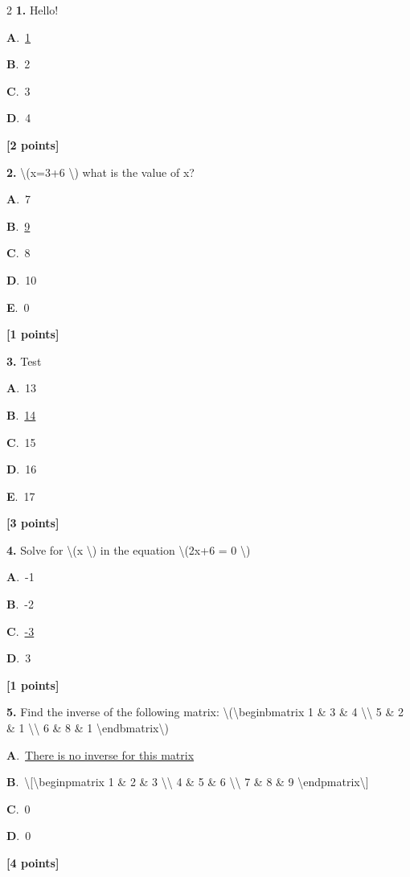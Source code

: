 \documentclass[12pt]{article}
\newcommand{\choice}[3]{%
  \noindent\textbf{#1}.~#2\hfill#3\par\vspace{0.25em}
}
\begin{document}
\begin{multicols}{2}
\noindent \textbf{\textenglish{1.}} {\textenglish{Hello!}}

\noindent\choice{A}{\underline{{\textenglish{1}}}}{}
\noindent\choice{B}{{\textenglish{2}}}{}
\noindent\choice{C}{{\textenglish{3}}}{}
\noindent\choice{D}{{\textenglish{4}}}{}
\hfill \textbf{[2 points]}\vspace{0.5em}

\noindent \textbf{\textenglish{2.}} {\textenglish{\textbackslash{}(x=3+6 \textbackslash{}) what is the value of x?}}

\noindent\choice{A}{{\textenglish{7}}}{}
\noindent\choice{B}{\underline{{\textenglish{9}}}}{}
\noindent\choice{C}{{\textenglish{8}}}{}
\noindent\choice{D}{{\textenglish{10}}}{}
\noindent\choice{E}{{\textenglish{0}}}{}
\hfill \textbf{[1 points]}\vspace{0.5em}

\noindent \textbf{\textenglish{3.}} {\textenglish{Test}}

\noindent\choice{A}{{\textenglish{13}}}{}
\noindent\choice{B}{\underline{{\textenglish{14}}}}{}
\noindent\choice{C}{{\textenglish{15}}}{}
\noindent\choice{D}{{\textenglish{16}}}{}
\noindent\choice{E}{{\textenglish{17}}}{}
\hfill \textbf{[3 points]}\vspace{0.5em}

\noindent \textbf{\textenglish{4.}} {\textenglish{Solve for \textbackslash{}(x \textbackslash{}) in the equation \textbackslash{}(2x+6 = 0 \textbackslash{})}}

\noindent\choice{A}{{\textenglish{-1}}}{}
\noindent\choice{B}{{\textenglish{-2}}}{}
\noindent\choice{C}{\underline{{\textenglish{-3}}}}{}
\noindent\choice{D}{{\textenglish{3}}}{}
\hfill \textbf{[1 points]}\vspace{0.5em}

\noindent \textbf{\textenglish{5.}} {\textenglish{Find the inverse of the following matrix: \textbackslash{}(\textbackslash{}begin{bmatrix} 1 \& 3 \& 4 \textbackslash{}\textbackslash{} 5 \& 2 \& 1 \textbackslash{}\textbackslash{} 6 \& 8 \& 1 \textbackslash{}end{bmatrix}\textbackslash{})}}

\noindent\choice{A}{\underline{{\textenglish{There is no inverse for this matrix}}}}{}
\noindent\choice{B}{{\textenglish{\textbackslash{}[\textbackslash{}begin{pmatrix} 1 \& 2 \& 3 \textbackslash{}\textbackslash{} 4 \& 5 \& 6 \textbackslash{}\textbackslash{} 7 \& 8 \& 9  \textbackslash{}end{pmatrix}\textbackslash{}]}}}{}
\noindent\choice{C}{{\textenglish{0}}}{}
\noindent\choice{D}{{\textenglish{0}}}{}
\hfill \textbf{[4 points]}\vspace{0.5em}


\end{multicols}
\end{document}

